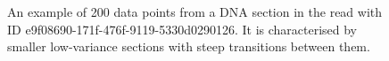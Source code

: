\begin{figure}
\centering

\caption{\label{fig:dna-section}An example of 200 data points from a DNA section in the read with ID e9f08690-171f-476f-9119-5330d0290126. It is characterised by smaller low-variance sections with steep transitions between them.}
\end{figure}
